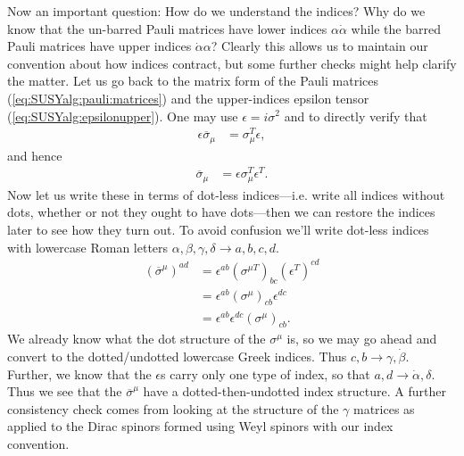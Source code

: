 Now an important question: How do we understand the indices? Why do we know that the un-barred Pauli matrices have lower indices $\alpha\dot\alpha$ while the barred Pauli matrices have upper indices $\dot\alpha\alpha$? Clearly this allows us to maintain our convention about how indices contract, but some further checks might help clarify the matter. Let us go back to the matrix form of the Pauli matrices (\ref{eq:SUSYalg:pauli:matrices}) and the upper-indices epsilon tensor (\ref{eq:SUSYalg:epsilonupper}). One may use $\epsilon = i\sigma^2$ and to directly verify that 
\begin{align}
    \epsilon\overline\sigma_\mu &= \sigma_\mu^T\epsilon,
\end{align}
and hence
\begin{align}
    \overline\sigma_\mu &= \epsilon\sigma_\mu^T\epsilon^T.
\end{align}
Now let us write these in terms of dot-less indices---i.e. write all indices without dots, whether or not they ought to have dots---then we can restore the indices later to see how they turn out. To avoid confusion we'll write dot-less indices with lowercase Roman letters $\alpha,\beta,\gamma,\delta \rightarrow a,b,c,d$.
\begin{align}
    (\overline \sigma^\mu)^{ad} &= \epsilon^{ab}(\sigma^{\mu T})_{bc}(\epsilon^T)^{cd}\\
    &= \epsilon^{ab}(\sigma^\mu)_{cb} \epsilon^{dc}\\
    &= \epsilon^{ab}\epsilon^{dc}(\sigma^\mu)_{cb}.
\end{align}
We already know what the dot structure of the $\sigma^\mu$ is, so we may go ahead and convert to the dotted/undotted lowercase Greek indices. Thus $c,b \rightarrow \gamma,\dot\beta$. Further, we know that the $\epsilon$s carry only one type of index, so that $a,d \rightarrow \dot\alpha,\delta$. 
Thus we see that the $\overline\sigma^\mu$ have a dotted-then-undotted index structure. A further consistency check comes from looking at the structure of the $\gamma$ matrices as applied to the Dirac spinors formed using Weyl spinors with our index convention. %




